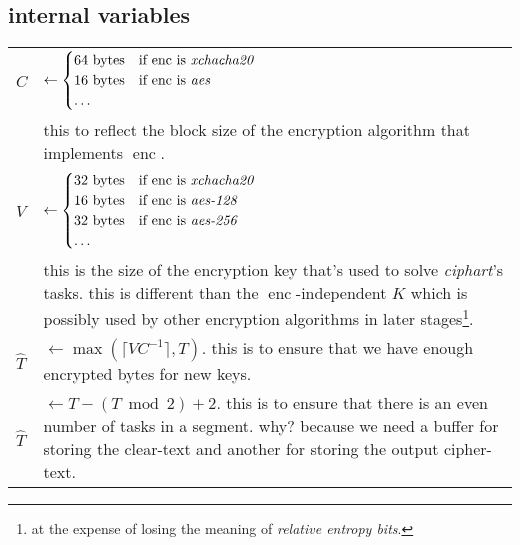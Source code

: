 \documentclass[twocolumn]{article}
\DeclareMathOperator{\enc}{enc}
\DeclareMathOperator{\maxf}{max}
\begin{document}
\subsection{internal variables}
\begin{tabularx}{\columnwidth}{lX}
    $C$         & $\gets \begin{cases}
                        64 \text{ bytes} & \text{if $\enc$ is
                                            \emph{xchacha20}}\\
                        16 \text{ bytes} & \text{if $\enc$ is \emph{aes}}\\
                        \ldots & \\
                     \end{cases}$\\
                & this to reflect the block size of the encryption
                    algorithm that implements $\enc$.\\
    $V$ & $\gets \begin{cases}
                        32 \text{ bytes} & \text{if $\enc$ is
                                            \emph{xchacha20}}\\
                        16 \text{ bytes} & \text{if $\enc$ is
                            \emph{aes-128}}\\
                        32 \text{ bytes} & \text{if $\enc$ is
                            \emph{aes-256}}\\
                        \ldots & \\
                     \end{cases}$\\
                & this is the size of the encryption key that's used to
                    solve \emph{ciphart}'s tasks.  this is different than
                    the $\enc$-independent $K$ which is
                    possibly used by other encryption algorithms in later
                    stages\footnote{at the expense of losing the meaning of
                    \emph{relative entropy bits}.}.\\
    $\hat T$    & $\gets \maxf(\lceil V C^{-1}\rceil, T)$.  this
                    is to ensure that we have enough encrypted bytes for
                    new keys.\\
    $\hat T$    & $\gets T - (T \bmod 2) + 2$.  this is to ensure that
                    there is an even number of tasks in a segment.  why?
                    because we need a buffer for storing the clear-text and
                    another for storing the output cipher-text.\\
\end{tabularx}
\end{document}
